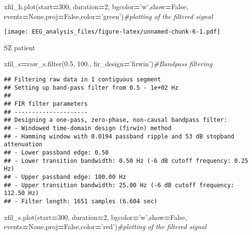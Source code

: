 \documentclass[]{book}
\newenvironment{Shaded}{\begin{snugshade}}{\end{snugshade}}
\newcommand{\BuiltInTok}[1]{#1}
\newcommand{\CommentTok}[1]{\textcolor[rgb]{0.56,0.35,0.01}{\textit{#1}}}
\newcommand{\DecValTok}[1]{\textcolor[rgb]{0.00,0.00,0.81}{#1}}
\newcommand{\FloatTok}[1]{\textcolor[rgb]{0.00,0.00,0.81}{#1}}
\newcommand{\NormalTok}[1]{#1}
\newcommand{\OperatorTok}[1]{\textcolor[rgb]{0.81,0.36,0.00}{\textbf{#1}}}
\newcommand{\StringTok}[1]{\textcolor[rgb]{0.31,0.60,0.02}{#1}}
\newcommand{\VariableTok}[1]{\textcolor[rgb]{0.00,0.00,0.00}{#1}}
\begin{document}
\begin{Shaded}
\begin{Highlighting}[]
\NormalTok{xfil_h.plot(start}\OperatorTok{=}\DecValTok{300}\NormalTok{, duration}\OperatorTok{=}\DecValTok{2}\NormalTok{, bgcolor}\OperatorTok{=}\StringTok{'w'}\NormalTok{,show}\OperatorTok{=}\VariableTok{False}\NormalTok{, events}\OperatorTok{=}\VariableTok{None}\NormalTok{,proj}\OperatorTok{=}\VariableTok{False}\NormalTok{,color}\OperatorTok{=}\StringTok{'green'}\NormalTok{)}\CommentTok{#plotting of the filtered signal}
\end{Highlighting}
\end{Shaded}

\texttt{[image: EEG\_analysis\_files/figure-latex/unnamed-chunk-6-1.pdf]}

SZ patient

\begin{Shaded}
\begin{Highlighting}[]
\NormalTok{xfil_s}\OperatorTok{=}\NormalTok{raw_s.}\BuiltInTok{filter}\NormalTok{(}\FloatTok{0.5}\NormalTok{, }\FloatTok{100.}\NormalTok{, fir_design}\OperatorTok{=}\StringTok{'firwin'}\NormalTok{)}\CommentTok{#Bandpass filtering}
\end{Highlighting}
\end{Shaded}

\begin{verbatim}
## Filtering raw data in 1 contiguous segment
## Setting up band-pass filter from 0.5 - 1e+02 Hz
## 
## FIR filter parameters
## ---------------------
## Designing a one-pass, zero-phase, non-causal bandpass filter:
## - Windowed time-domain design (firwin) method
## - Hamming window with 0.0194 passband ripple and 53 dB stopband attenuation
## - Lower passband edge: 0.50
## - Lower transition bandwidth: 0.50 Hz (-6 dB cutoff frequency: 0.25 Hz)
## - Upper passband edge: 100.00 Hz
## - Upper transition bandwidth: 25.00 Hz (-6 dB cutoff frequency: 112.50 Hz)
## - Filter length: 1651 samples (6.604 sec)
\end{verbatim}

\begin{Shaded}
\begin{Highlighting}[]
\NormalTok{xfil_s.plot(start}\OperatorTok{=}\DecValTok{300}\NormalTok{, duration}\OperatorTok{=}\DecValTok{2}\NormalTok{, bgcolor}\OperatorTok{=}\StringTok{'w'}\NormalTok{,show}\OperatorTok{=}\VariableTok{False}\NormalTok{, events}\OperatorTok{=}\VariableTok{None}\NormalTok{,proj}\OperatorTok{=}\VariableTok{False}\NormalTok{,color}\OperatorTok{=}\StringTok{'red'}\NormalTok{)}\CommentTok{#plotting of the filtered signal}
\end{Highlighting}
\end{Shaded}
\end{document}
